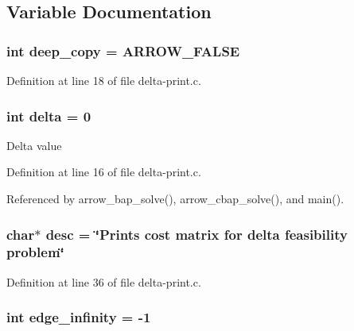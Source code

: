 \subsection{Variable Documentation}
\hypertarget{delta-print_8c_7298da576a5b127d04b4c46b3bc78821}{
\subsubsection[{deep\_\-copy}]{\setlength{\rightskip}{0pt plus 5cm}int {\bf deep\_\-copy} = ARROW\_\-FALSE}}
\label{delta-print_8c_7298da576a5b127d04b4c46b3bc78821}




Definition at line 18 of file delta-print.c.\hypertarget{delta-print_8c_1dfcb70b9229f2da17dd5922b87ecf2c}{
\subsubsection[{delta}]{\setlength{\rightskip}{0pt plus 5cm}int {\bf delta} = 0}}
\label{delta-print_8c_1dfcb70b9229f2da17dd5922b87ecf2c}


Delta value 

Definition at line 16 of file delta-print.c.

Referenced by arrow\_\-bap\_\-solve(), arrow\_\-cbap\_\-solve(), and main().\hypertarget{delta-print_8c_3aad16fd4bea1b9717f232ea75ad6449}{
\subsubsection[{desc}]{\setlength{\rightskip}{0pt plus 5cm}char$\ast$ {\bf desc} = \char`\"{}Prints cost matrix for {\bf delta} feasibility problem\char`\"{}}}
\label{delta-print_8c_3aad16fd4bea1b9717f232ea75ad6449}




Definition at line 36 of file delta-print.c.\hypertarget{delta-print_8c_61a12d5995172f376610cce2f19e5855}{
\subsubsection[{edge\_\-infinity}]{\setlength{\rightskip}{0pt plus 5cm}int {\bf edge\_\-infinity} = -1}}
\label{delta-print_8c_61a12d5995172f376610cce2f19e5855}




